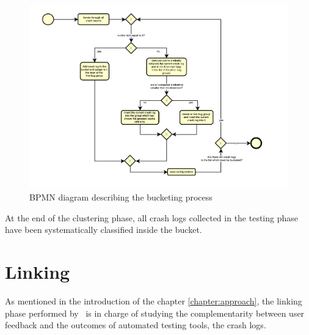 \begin{figure}[tb]
\centering 
\includegraphics[width=\columnwidth]{diagrams/bucketingprocess.pdf} 
\caption{BPMN diagram describing the bucketing process}
\label{bucketing}
\end{figure}

At the end of the clustering phase, all crash logs collected in the testing phase have been systematically classified inside the bucket. 



\section{Linking}
\label{tool: linking}
As mentioned in the introduction of the chapter \ref{chapter:approach}, the linking phase performed by \toolname\ is in charge of studying the complementarity between user feedback and the outcomes of automated testing tools, \ie the crash logs. 



